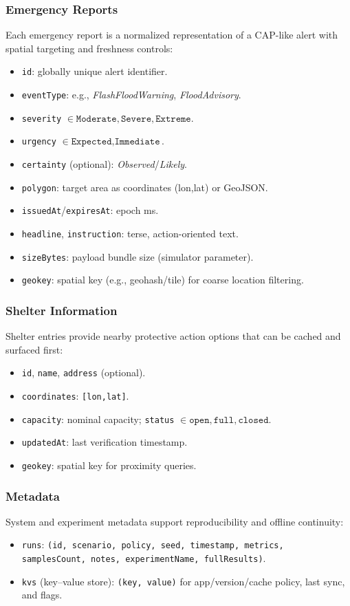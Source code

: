 \documentclass[11pt,twocolumn]{article}
\begin{document}
\subsubsection{Emergency Reports}
Each emergency report is a normalized representation of a CAP-like alert with spatial targeting and freshness controls:
\begin{itemize}
\item \texttt{id}: globally unique alert identifier.
\item \texttt{eventType}: e.g., \emph{FlashFloodWarning}, \emph{FloodAdvisory}.
\item \texttt{severity} $\in {\texttt{Moderate},\texttt{Severe},\texttt{Extreme}}$.
\item \texttt{urgency} $\in {\texttt{Expected},\texttt{Immediate}}$.
\item \texttt{certainty} (optional): \emph{Observed}/\emph{Likely}.
\item \texttt{polygon}: target area as coordinates (lon,lat) or GeoJSON.
\item \texttt{issuedAt}/\texttt{expiresAt}: epoch ms.
\item \texttt{headline}, \texttt{instruction}: terse, action-oriented text.
\item \texttt{sizeBytes}: payload bundle size (simulator parameter).
\item \texttt{geokey}: spatial key (e.g., geohash/tile) for coarse location filtering.
\end{itemize}

\subsubsection{Shelter Information}
Shelter entries provide nearby protective action options that can be cached and surfaced first:
\begin{itemize}
\item \texttt{id}, \texttt{name}, \texttt{address} (optional).
\item \texttt{coordinates}: \texttt{[lon,lat]}.
\item \texttt{capacity}: nominal capacity; \texttt{status} $\in {\texttt{open},\texttt{full},\texttt{closed}}$.
\item \texttt{updatedAt}: last verification timestamp.
\item \texttt{geokey}: spatial key for proximity queries.
\end{itemize}

\subsubsection{Metadata}
System and experiment metadata support reproducibility and offline continuity:
\begin{itemize}
\item \texttt{runs}: \texttt{(id, scenario, policy, seed, timestamp, metrics, samplesCount, notes, experimentName, fullResults)}.
\item \texttt{kvs} (key–value store): \texttt{(key, value)} for app/version/cache policy, last sync, and flags.
\end{itemize}
\end{document}
